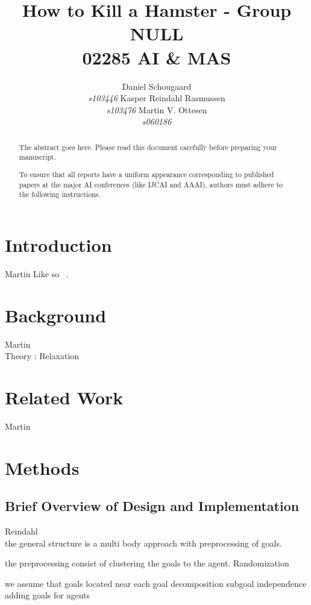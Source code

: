 \documentclass[letterpaper]{article}
\begin{document}
\title{How to Kill a Hamster - Group NULL\\ 02285 AI \& MAS}
\author{Daniel Schougaard \\ \textit{s103446} \And Kasper Reindahl Rasmussen\\ \textit{s103476} \And Martin V. Ottesen\\ \textit{s060186}}
\maketitle

\begin{abstract}
The abstract goes here. Please read this document carefully before preparing your manuscript.

To ensure that all reports have a uniform appearance corresponding to published papers at the major AI conferences (like IJCAI and AAAI), authors must adhere to the following instructions. 
\end{abstract}

\section{Introduction}
	Martin
	Like so ~\cite{book2015}. 
\section{Background}
	Martin\\
	Theory : Relaxation

\section{Related Work}
	Martin

\section{Methods}
	\subsection{Brief Overview of Design and Implementation}
		Reindahl\\
		the general structure is a multi body approach with preprocessing of goals.
		
		the preprocessing consist of clustering the goals to the agent.
			Randomization
		
		we assume that goals located near each 
		goal decomposition 
			subgoal independence
			adding goals for agents
		
\end{document}
